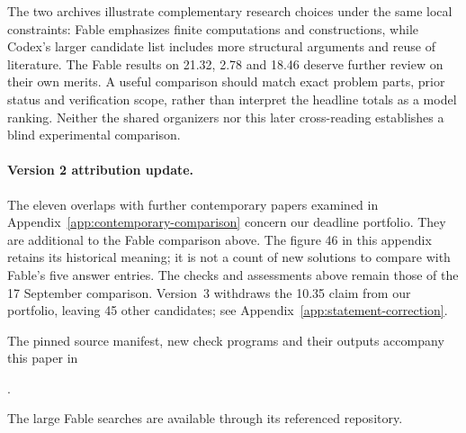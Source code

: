 The two archives illustrate complementary research choices under
the same local constraints: Fable emphasizes finite computations and
constructions, while Codex's larger candidate list includes more
structural arguments and reuse of literature. The Fable results on
21.32, 2.78 and 18.46 deserve further review on their own merits.
A useful comparison should match exact problem parts, prior status
and verification scope, rather than interpret the headline totals
as a model ranking. Neither the shared organizers nor this later
cross-reading establishes a blind experimental comparison.

\paragraph{Version 2 attribution update.}
The eleven overlaps with further contemporary papers examined in
Appendix~\ref{app:contemporary-comparison} concern our deadline portfolio.
They are additional to the Fable comparison above. The figure 46 in
this appendix retains its historical meaning; it is not a count of new
solutions to compare with Fable's five answer entries. The checks and
assessments above remain those of the 17 September comparison.
Version~3 withdraws the 10.35 claim from our portfolio, leaving 45
other candidates; see Appendix~\ref{app:statement-correction}.

The pinned source manifest, new check programs and their outputs
accompany this paper in
\begin{center}\small
{}.
\end{center}
The large Fable searches are available through its referenced repository.

